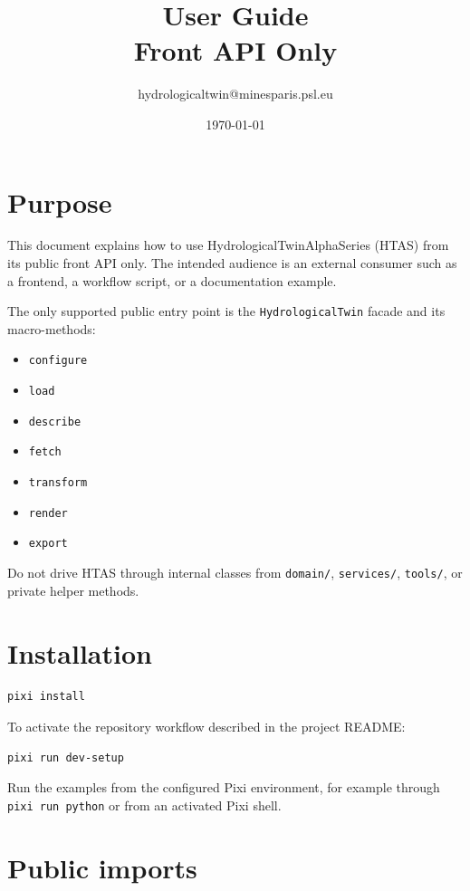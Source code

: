 \documentclass[11pt]{article}
\title{\alphaht\version User Guide\\Front API Only\\}
\author{hydrologicaltwin@minesparis.psl.eu}
\date{\today}
\begin{document}
\maketitle

\section{Purpose}

This document explains how to use HydrologicalTwinAlphaSeries (HTAS) from its
public front API only. The intended audience is an external consumer such as a
frontend, a workflow script, or a documentation example.

The only supported public entry point is the \texttt{HydrologicalTwin} facade
and its macro-methods:

\begin{itemize}
    \item \texttt{configure}
    \item \texttt{load}
    \item \texttt{describe}
    \item \texttt{fetch}
    \item \texttt{transform}
    \item \texttt{render}
    \item \texttt{export}
\end{itemize}

Do not drive HTAS through internal classes from \texttt{domain/},
\texttt{services/}, \texttt{tools/}, or private helper methods.

\section{Installation}

\begin{verbatim}
pixi install
\end{verbatim}

To activate the repository workflow described in the project README:

\begin{verbatim}
pixi run dev-setup
\end{verbatim}

Run the examples from the configured Pixi environment, for example through
\texttt{pixi run python} or from an activated Pixi shell.

\section{Public imports}
\end{document}
